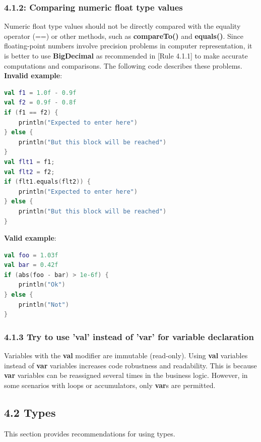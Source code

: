 \subsubsection*{\textbf{4.1.2: Comparing numeric float type values}}
\leavevmode\newline
\label{sec:4.1.2}
Numeric float type values should not be directly compared with the equality operator (==) or other methods, such as \textbf{compareTo()} and \textbf{equals()}. Since floating-point numbers involve precision problems in computer representation, it is better to use \textbf{BigDecimal} as recommended in [Rule 4.1.1] to make accurate computations and comparisons. The following code describes these problems.
\textbf{Invalid example}:
\begin{lstlisting}[language=Kotlin]
val f1 = 1.0f - 0.9f
val f2 = 0.9f - 0.8f
if (f1 == f2) {
    println("Expected to enter here")
} else {
    println("But this block will be reached")
}
val flt1 = f1;
val flt2 = f2;
if (flt1.equals(flt2)) {
    println("Expected to enter here")
} else {
    println("But this block will be reached")
} 
\end{lstlisting}
\textbf{Valid example}:
\begin{lstlisting}[language=Kotlin]
val foo = 1.03f
val bar = 0.42f
if (abs(foo - bar) > 1e-6f) {
    println("Ok")
} else {
    println("Not")
}
\end{lstlisting}
\subsubsection*{\textbf{4.1.3 Try to use 'val' instead of 'var' for variable declaration}}
\leavevmode\newline
\label{sec:4.1.3}
Variables with the \textbf{val} modifier are immutable (read-only).
Using \textbf{val} variables instead of \textbf{var} variables increases code robustness and readability.
This is because \textbf{var} variables can be reassigned several times in the business logic.
However, in some scenarios with loops or accumulators, only \textbf{var}s are permitted.
\subsection*{\textbf{4.2 Types}}
\label{sec:4.2}
This section provides recommendations for using types.
